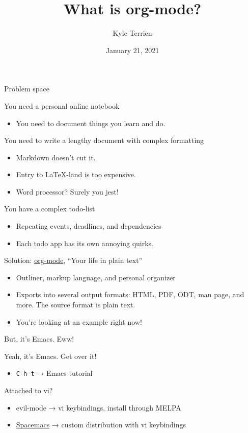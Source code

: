 \documentclass[presentation]{beamer}
\author{Kyle Terrien}
\date{January 21, 2021}
\title{What is org-mode?}
\begin{document}
\maketitle

\begin{frame}[label={sec:orgd5e9316}]{Problem space}
\begin{block}{You need a personal online notebook}
\begin{itemize}
\item You need to document things you learn and do.
\end{itemize}
\end{block}
\begin{block}{You need to write a lengthy document with complex formatting}
\begin{itemize}
\item Markdown doesn’t cut it.
\item Entry to \LaTeX{}-land is too expensive.
\item Word processor?  Surely you jest!
\end{itemize}
\end{block}
\begin{block}{You have a complex todo-list}
\begin{itemize}
\item Repeating events, deadlines, and dependencies
\item Each todo app has its own annoying quirks.
\end{itemize}
\end{block}
\end{frame}
\begin{frame}[label={sec:org1e6d28d}]{Solution: \href{https://orgmode.org/}{org-mode}, “Your life in plain text”}
\begin{itemize}
\item Outliner, markup language, and personal organizer
\item Exports into several output formats: HTML, PDF, ODT, man page, and
more.  The source format is plain text.
\item You’re looking at an example right now!
\end{itemize}
\end{frame}
\begin{frame}[label={sec:orgf9a596f},fragile]{But, it’s Emacs.  Eww!}
 \begin{block}{Yeah, it’s Emacs.  Get over it!}
\begin{itemize}
\item \texttt{C-h t} → Emacs tutorial
\end{itemize}
\end{block}
\begin{block}{Attached to vi?}
\begin{itemize}
\item evil-mode → vi keybindings, install through MELPA
\item \href{https://www.spacemacs.org/}{Spacemacs} → custom distribution with vi keybindings
\end{itemize}
\end{block}
\end{frame}
\end{document}
